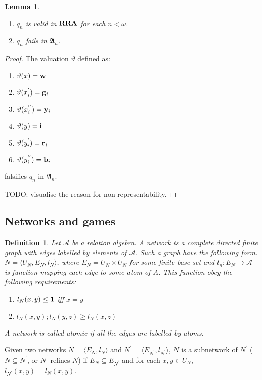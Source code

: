 \documentclass[a4paper]{article}
\theoremstyle{defin}
\newtheorem{defin}{Definition}
\theoremstyle{theorem}
\theoremstyle{prop}
\theoremstyle{lemma}
\newtheorem{lemma}{Lemma}
\theoremstyle{ex}
\theoremstyle{col}
\theoremstyle{claim}
\begin{document}
\begin{lemma}

  \begin{enumerate}
    \item $q_n$ is valid in ${\bf RRA}$ for each $n < \omega$.
    \item $q_n$ fails in $\mathfrak{A}_n$.
  \end{enumerate}
\end{lemma}

\begin{proof}
  The valuation $\vartheta$ defined as:
  \begin{enumerate}
    \item $\vartheta(x) = {\bf w}$
    \item $\vartheta(x_i^{'}) = {\bf g}_i$
    \item $\vartheta(x_i^{''}) = {\bf y}_i$
    \item $\vartheta(y) = {\bf i}$
    \item $\vartheta(y_i^{'}) = {\bf r}_i$
    \item $\vartheta(y_i^{''}) = {\bf b}_i$
  \end{enumerate}
  falsifies $q_n$ in $\mathfrak{A}_n$.

  TODO: visualise the reason for non-representability.
\end{proof}

\subsection{Networks and games}

\begin{defin}
  Let $\mathcal{A}$ be a relation algebra. A network is a complete directed finite graph with edges labelled by elements of $\mathcal{A}$. Such a graph have the following form. $N = \langle U_N, E_N, l_N \rangle$, where $E_N = U_N \times U_N$ for some finite base set and $l_n : E_N \to \mathcal{A}$ is function mapping each edge to some atom of $A$. This function obey the following requirements:
  \begin{enumerate}
    \item $l_N(x,y) \leq {\bf 1}$ iff $x = y$
    \item $l_N(x, y) ; l_N(y,z) \geq l_N(x,z)$
  \end{enumerate}
  A network is called atomic if all the edges are labelled by atoms.
\end{defin}
Given two networks $N = \langle E_N, l_N \rangle$ and $N^{'} = \langle E_{N^{'}}, l_{N^{'}} \rangle$, $N$ is a subnetwork of $N^{'}$ ($N \subseteq N^{'}$, or $N^{'}$ refines $N$) if $E_N \subseteq E_{N^{'}}$ and for each $x,y \in U_N$, $l_{N^{'}}(x,y) = l_{N}(x,y)$.
\end{document}
